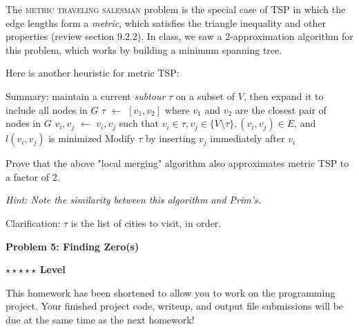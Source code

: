 \documentclass{article}\usepackage[utf8]{inputenc}\usepackage[margin=0.4cm,top=0.4cm,bottom=0.4cm]{geometry}\usepackage[usenames,dvipsnames,svgnames,table]{xcolor}
\newcommand*\Let[2]{\State #1 $\gets$ #2}
\begin{document}
\noindent The \textsc{metric traveling salesman} problem is the special case of TSP in which the edge lengths form a \textit{metric}, which satisfies the triangle inequality and other properties (review section 9.2.2). In class, we saw a 2-approximation algorithm for this problem, which works by building a minimum spanning tree.

\vspace{2pt}\noindent Here is another heuristic for metric TSP:
\begin{algorithm}
\begin{algorithmic}[1]
\vspace{-10pt}\State Summary: maintain a current \textit{subtour} $\tau$ on a subset of $V$, then expand it to include all nodes in $G$
\vspace{12pt}
\Let {$\tau$}{$[v_1, v_2]$ where $v_1$ and $v_2$ are the closest pair of nodes in $G$}
\Let {$v_i, v_j$}{$v_i, v_j$ such that $v_i \in \tau, v_j \in \{V \setminus \tau\},(v_i, v_j) \in E$, and $l(v_i, v_j)$ is minimized}
\State Modify $\tau$ by inserting $v_j$ immediately after $v_i$
\EndWhile
\EndFunction
\end{algorithmic}
\end{algorithm}

\noindent Prove that the above "local merging" algorithm also approximates metric TSP to a factor of 2.

\vspace{4pt}\noindent \textit{Hint: Note the similarity between this algorithm and Prim's.}

\vspace{4pt}\noindent Clarification: $\tau$ is the list of cities to visit, in order.
\BeginSolution %
\EndSolution
\clearpage

\vspace{-2mm}\noindent\begin{mybox}{\begin{center}\textbf{\color{black}Problem 5: Finding Zero(s)}\end{center}}\end{mybox}\vspace{-2mm}
\begin{myboxot}\noindent\textbf{$\star\star\star\star\star$ Level}\end{myboxot} 

\noindent This homework has been shortened to allow you to work on the programming project. Your finished project
code, writeup, and output file submissions will be due at the same time as the next homework!
\end{document}
